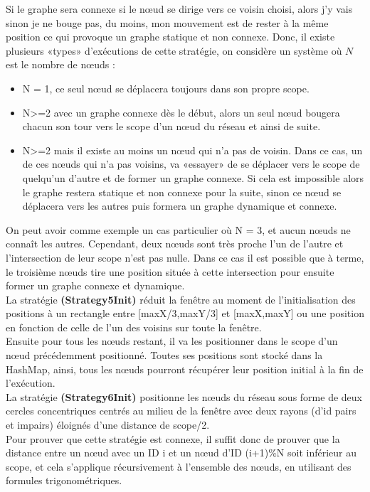 \documentclass[10pt]{report}
\begin{document}
Si le graphe sera connexe si le nœud se dirige vers ce voisin choisi, alors j’y vais sinon je ne bouge pas, du moins, mon mouvement est de rester à la même position ce qui provoque un graphe statique et non connexe.
Donc, il existe plusieurs «types» d’exécutions de cette stratégie, on considère un système où $N$ est le nombre de nœuds :
\begin{itemize}
\item N = 1, ce seul nœud se déplacera toujours dans son propre scope.
\item N>=2 avec un graphe connexe dès le début, alors un seul nœud bougera chacun son tour vers le scope d’un nœud du réseau et ainsi de suite.
\item N>=2 mais il existe au moins un nœud qui n’a pas de voisin. Dans ce cas, un de ces nœuds qui n’a pas voisins, va «essayer» de se déplacer vers le scope de quelqu’un d’autre et de former un graphe connexe. Si cela est impossible alors le graphe restera statique et non connexe pour la suite, sinon ce nœud se déplacera vers les autres puis formera un graphe dynamique et connexe.
\end{itemize}
On peut avoir comme exemple un cas particulier où N = 3, et aucun nœuds ne connaît les autres. Cependant, deux nœuds sont très proche l’un de l’autre et l’intersection de leur scope n’est pas nulle. Dans ce cas il est possible que à terme, le troisième nœuds tire une position située à cette intersection pour ensuite former un graphe connexe et dynamique.\\

La stratégie \textbf{(Strategy5Init)} réduit la fenêtre au moment de l'initialisation des positions à un rectangle entre [maxX/3,maxY/3] et [maxX,maxY] ou une position en fonction de celle de l'un des voisins sur toute la fenêtre.\\
Ensuite pour tous les nœuds restant, il va les positionner dans le scope d’un nœud précédemment positionné. Toutes ses positions sont stocké dans la HashMap, ainsi, tous les nœuds pourront récupérer leur position initial à la fin de l’exécution.\\

La stratégie \textbf{(Strategy6Init)} positionne les nœuds du réseau sous forme de deux cercles concentriques centrés au milieu de la fenêtre avec deux rayons (d'id pairs et impairs) éloignés d'une distance de scope/2.\\
Pour prouver que cette stratégie est connexe, il suffit donc de prouver que la distance entre un nœud avec un ID i et un nœud d’ID (i+1)\%N soit inférieur au scope, et cela s’applique récursivement à l’ensemble des nœuds, en utilisant des formules trigonométriques.
\end{document}
